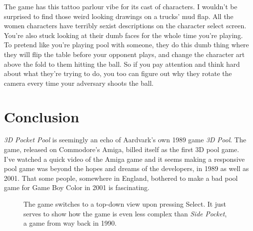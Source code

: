 \documentclass{book}
\begin{document}
The game has this tattoo parlour vibe for its cast of characters. I wouldn’t be surprised to find those weird looking drawings on a trucks’ mud flap. All the women characters have terribly sexist descriptions on the character select screen. You’re also stuck looking at their dumb faces for the whole time you’re playing. To pretend like you’re playing pool with someone, they do this dumb thing where they will flip the table before your opponent plays, and change the character art above the fold to them hitting the ball. So if you pay attention and think hard about what they’re trying to do, you too can figure out why they rotate the camera every time your adversary shoots the ball.\par
\FloatBarrier\section*{Conclusion}
\emph{3D Pocket Pool} is seemingly an echo of Aardvark’s own 1989 game \emph{3D Pool}. The game, released on Commodore’s Amiga, billed itself as the first 3D pool game. I’ve watched a quick video of the Amiga game and it seems making a responsive pool game was beyond the hopes and dreams of the developers, in 1989 as well as 2001. That some people, somewhere in England, bothered to make a bad pool game for Game Boy Color in 2001 is fascinating.\par
\FloatBarrier\vspace{\baselineskip}\begin{figure}[H]\caption*{The game switches to a top-down view upon pressing Select. It just serves to show how the game is even less complex than \emph{Side Pocket}, a game from way back in 1990.}\end{figure}
\end{document}
